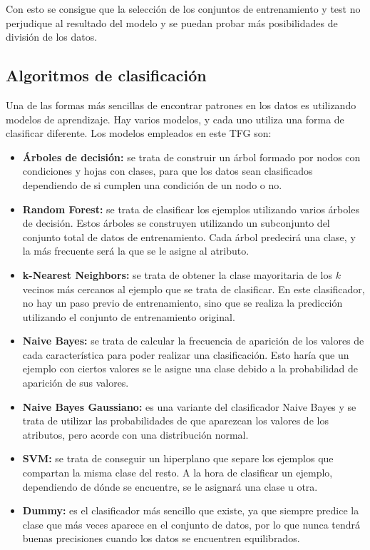 Con esto se consigue que la selección de los conjuntos de entrenamiento y test no perjudique al resultado del modelo y se puedan probar más posibilidades de división de los datos.

\subsection{Algoritmos de clasificación} \label{clasificadores}
Una de las formas más sencillas de encontrar patrones en los datos es utilizando modelos de aprendizaje. Hay varios modelos, y cada uno utiliza una forma de clasificar diferente. Los modelos empleados en este TFG son:
\begin{itemize}
	\item \textbf{Árboles de decisión:} se trata de construir un árbol formado por nodos con condiciones y hojas con clases, para que los datos sean clasificados dependiendo de si cumplen una condición de un nodo o no.~\cite{arbol_decision}
	\item \textbf{Random Forest:} se trata de clasificar los ejemplos utilizando varios árboles de decisión. Estos árboles se construyen utilizando un subconjunto del conjunto total de datos de entrenamiento. Cada árbol predecirá una clase, y la más frecuente será la que se le asigne al atributo.~\cite{random_forest}
	\item \textbf{k-Nearest Neighbors:} se trata de obtener la clase mayoritaria de los $k$ vecinos más cercanos al ejemplo que se trata de clasificar. En este clasificador, no hay un paso previo de entrenamiento, sino que se realiza la predicción utilizando el conjunto de entrenamiento original.~\cite{knn}
	\item \textbf{Naive Bayes:} se trata de calcular la frecuencia de aparición de los valores de cada característica para poder realizar una clasificación. Esto haría que un ejemplo con ciertos valores se le asigne una clase debido a la probabilidad de aparición de sus valores.~\cite{naive_bayes}
	\item \textbf{Naive Bayes Gaussiano:} es una variante del clasificador Naive Bayes y se trata de utilizar las probabilidades de que aparezcan los valores de los atributos, pero acorde con una distribución normal.~\cite{naive_bayes_g}
	\item \textbf{SVM:} se trata de conseguir un hiperplano que separe los ejemplos que compartan la misma clase del resto. A la hora de clasificar un ejemplo, dependiendo de dónde se encuentre, se le asignará una clase u otra.~\cite{svm}
	\item \textbf{Dummy:} es el clasificador más sencillo que existe, ya que siempre predice la clase que más veces aparece en el conjunto de datos, por lo que nunca tendrá buenas precisiones cuando los datos se encuentren equilibrados.~\cite{dummy}
\end{itemize}


